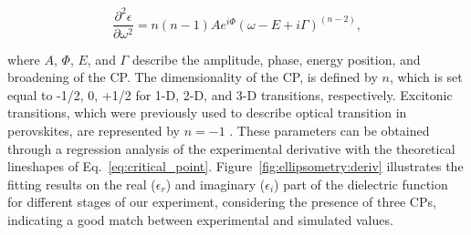 \begin{equation}
    \frac{\partial ^2\epsilon}{\partial \omega^2} = n(n-1)Ae^{i\Phi}(\omega -E +i\Gamma)^{(n-2)},
    \label{eq:critical_point}
\end{equation}

where $A$, $\Phi$, $E$, and $\Gamma$ describe the amplitude, phase, energy position, and broadening of the CP. The dimensionality of the CP, is defined by $n$, which is set equal to -1/2, 0, +1/2 for 1-D, 2-D, and 3-D transitions, respectively. Excitonic transitions, which were previously used to describe optical transition in perovskites, are represented by $n=-1$ \cite{Jiang2016TemperatureEllipsometry, Ceratti2021CsPbBr3Air}. These parameters can be obtained through a regression analysis of the experimental derivative with the theoretical lineshapes of Eq.~\ref{eq:critical_point}. Figure~\ref{fig:ellipsometry:deriv} illustrates the fitting results on the real ($\epsilon_r$) and imaginary ($\epsilon_i$) part of the dielectric function for different stages of our experiment, considering the presence of three CPs, indicating a good match between experimental and simulated values. 

